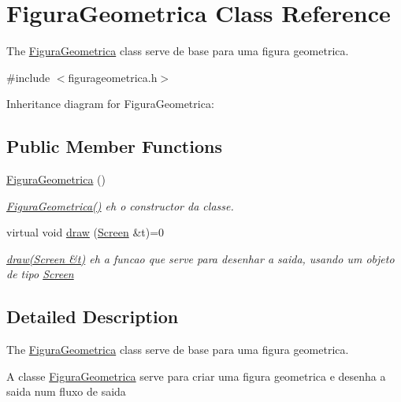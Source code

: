 \hypertarget{classFiguraGeometrica}{}\section{Figura\+Geometrica Class Reference}
\label{classFiguraGeometrica}


The \hyperlink{classFiguraGeometrica}{Figura\+Geometrica} class serve de base para uma figura geometrica.  




{\ttfamily \#include $<$figurageometrica.\+h$>$}



Inheritance diagram for Figura\+Geometrica\+:
\subsection*{Public Member Functions}
\begin{DoxyCompactItemize}
\item 
\mbox{\label{classFiguraGeometrica_a81d7c7efaea511e60a15f5a363138dd9}} 
\hyperlink{classFiguraGeometrica_a81d7c7efaea511e60a15f5a363138dd9}{Figura\+Geometrica} ()
\begin{DoxyCompactList}\small\item\em \hyperlink{classFiguraGeometrica_a81d7c7efaea511e60a15f5a363138dd9}{Figura\+Geometrica()} eh o constructor da classe. \end{DoxyCompactList}\item 
virtual void \hyperlink{classFiguraGeometrica_a8ee8dedc060b6059a805ea091aef2c41}{draw} (\hyperlink{classScreen}{Screen} \&t)=0
\begin{DoxyCompactList}\small\item\em \hyperlink{classFiguraGeometrica_a8ee8dedc060b6059a805ea091aef2c41}{draw(\+Screen \&t)} eh a funcao que serve para desenhar a saida, usando um objeto de tipo \hyperlink{classScreen}{Screen} \end{DoxyCompactList}\end{DoxyCompactItemize}


\subsection{Detailed Description}
The \hyperlink{classFiguraGeometrica}{Figura\+Geometrica} class serve de base para uma figura geometrica. 

A classe \hyperlink{classFiguraGeometrica}{Figura\+Geometrica} serve para criar uma figura geometrica e desenha a saida num fluxo de saida 

